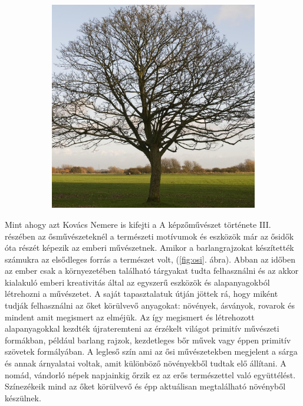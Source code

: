 \begin{figure}[ht!]
\begin{subfigure}[b]{0.225\textwidth}
		\caption{}    
	\end{subfigure}
	\hspace{10 mm}
	\begin{subfigure}[b]{0.225\textwidth}   
		\centering 
		\includegraphics[width=\textwidth]{img/nat_pat_04.jpg}
		\caption{}  
	\end{subfigure}
	\caption{}
	\label{fig:nat_pet}
\end{figure}

Mint ahogy azt Kovács Nemere is kifejti a A képzőművészet története III. részében az ősművészeteknél \cite{nemerekepzHomHuveszet} a természeti motívumok és eszközök már az ősidők óta részét képezik az emberi művészetnek. Amikor a barlangrajzokat készítették számukra az elsődleges forrás a természet volt, (\ref{fig:osi}. ábra).
Abban az időben az ember csak a környezetében található tárgyakat tudta felhasználni és az akkor kialakuló emberi kreativitás által az egyszerű eszközök és alapanyagokból létrehozni a művészetet. A saját tapasztalatuk útján jöttek rá, hogy miként tudják felhasználni az őket körülvevő anyagokat: növények, ásványok, rovarok és mindent amit megismert az elméjük. Az így megismert és létrehozott alapanyagokkal kezdték újrateremteni az érzékelt világot primitív művészeti formákban, például barlang rajzok, kezdetleges bőr művek vagy éppen primitív szövetek formályában. A legleső szín ami az ősi művészetekben megjelent a sárga és annak árnyalatai voltak, amit különböző növényekből tudtak elő állítani.
A nomád, vándorló népek napjainkig őrzik ez az erős természettel való együttélést. Színezékeik mind az őket körülvevő és épp aktuálisan megtalálható növényből készülnek.

